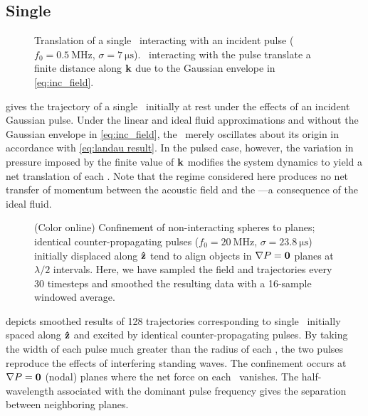 \subsection{Single \bubbles}

\begin{figure}
  \centering
  \caption{\label{fig:single_displacement}Translation of a single \bubble\ interacting with an incident pulse ($f_0 = \SI{0.5}{\mega\hertz}$, $\sigma = \SI{7}{\micro\second}$). \Bubbles\ interacting with the pulse translate a finite distance along $\vb{k}$ due to the Gaussian envelope in \cref{eq:inc_field}.}
\end{figure}

 gives the trajectory of a single \bubble\ initially at rest under the effects of an incident Gaussian pulse.
Under the linear and ideal fluid approximations and without the Gaussian envelope in \cref{eq:inc_field}, the \bubble\ merely oscillates about its origin in accordance with \cref{eq:landau result}.
In the pulsed case, however, the variation in pressure imposed by the finite value of $\vb{k}$ modifies the system dynamics to yield a net translation of each \bubble.
Note that the regime considered here produces no net transfer of momentum between the acoustic field and the \bubble---a consequence of the ideal fluid.

\begin{figure}
  \centering
  \caption{\label{fig:planar_confinement}
  (Color online) Confinement of non-interacting spheres to planes; identical counter-propagating pulses ($f_0 = \SI{20}{\mega\hertz}$, $\sigma = \SI{23.8}{\micro\second}$) initially displaced along $\vu{z}$ tend to align objects in $\nabla P = \vb{0}$ planes at $\lambda/2$ intervals.
    Here, we have sampled the field and trajectories every 30 timesteps and smoothed the resulting data with a 16-sample windowed average.
  }
\end{figure}

 depicts smoothed results of 128 trajectories corresponding to single \bubbles\ initially spaced along $\vu{z}$ and excited by identical counter-propagating pulses. 
By taking the width of each pulse much greater than the radius of each \bubble, the two pulses reproduce the effects of interfering standing waves. 
The confinement occurs at $\nabla P = \vb{0}$ (nodal) planes where the net force on each \bubble\ vanishes.
The half-wavelength associated with the dominant pulse frequency gives the separation between neighboring planes.

